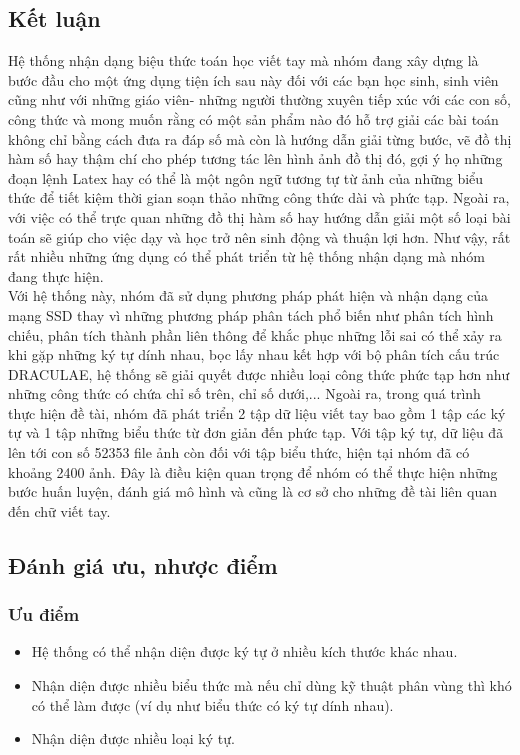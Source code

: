 \documentclass[a4paper]{article}
\theoremstyle{definition}
\begin{document}
	\subsection{Kết luận}
	Hệ thống nhận dạng biệu thức toán học viết tay mà nhóm đang xây dựng là bước đầu cho một ứng dụng tiện ích sau này đối với các bạn học sinh, sinh viên cũng như với những giáo viên- những người thường xuyên tiếp xúc với các con số, công thức và mong muốn rằng có một sản phẩm nào đó hỗ trợ giải các bài toán không chỉ bằng cách đưa ra đáp số mà còn là hướng dẫn giải từng bước, vẽ đồ thị hàm số hay thậm chí cho phép tương tác lên hình ảnh đồ thị đó, gợi ý họ những đoạn lệnh Latex hay có thể là một ngôn ngữ tương tự từ ảnh của những biểu thức để tiết kiệm thời gian soạn thảo những công thức dài và phức tạp. Ngoài ra, với việc có thể trực quan những đồ thị hàm số hay hướng dẫn giải một số loại bài toán sẽ giúp cho việc dạy và học trở nên sinh động và thuận lợi hơn. Như vậy, rất rất nhiều những ứng dụng có thể phát triển từ hệ thống nhận dạng mà nhóm đang thực hiện. \\
	Với hệ thống này, nhóm đã sử dụng phương pháp phát hiện và nhận dạng của mạng SSD thay vì những phương pháp phân tách phổ biến như phân tích hình chiếu, phân tích thành phần liên thông để khắc phục những lỗi sai có thể xảy ra khi gặp những ký tự dính nhau, bọc lấy nhau kết hợp với bộ phân tích cấu trúc DRACULAE, hệ thống sẽ giải quyết được nhiều loại công thức phức tạp hơn như những công thức có chứa chỉ số trên, chỉ số dưới,... 
	Ngoài ra, trong quá trình thực hiện đề tài, nhóm đã phát triển 2 tập dữ liệu viết tay bao gồm 1 tập các ký tự và 1 tập những biểu thức từ đơn giản đến phức tạp. Với tập ký tự, dữ liệu đã lên tới con số 52353 file ảnh còn đối với tập biểu thức, hiện tại nhóm đã có khoảng 2400 ảnh. Đây là điều kiện quan trọng để nhóm có thể thực hiện những bước huấn luyện, đánh giá mô hình và cũng là cơ sở cho những đề tài liên quan đến chữ viết tay. 
	\subsection{Đánh giá ưu, nhược điểm}
	
	\subsubsection{Ưu điểm}
	
	\begin{itemize}
		\item Hệ thống có thể nhận diện được ký tự ở nhiều kích thước khác nhau.
		\item Nhận diện được nhiều biểu thức mà nếu chỉ dùng kỹ thuật phân vùng thì khó có thể làm được (ví dụ như biểu thức có ký tự dính nhau).
		\item Nhận diện được nhiều loại ký tự.
	\end{itemize}
	
\end{document}
